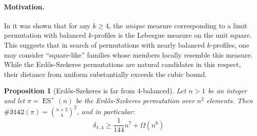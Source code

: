 \documentclass{article}
\newtheorem{proposition}[theorem]{Proposition}
\newcommand{\pc}[2]{{\# \mathtt{ #1 } \left( #2 \right)}}
\DeclareMathOperator{\ES}{ES}
\newcommand{\ESZ}{Erd\H{o}s-Szekeres\xspace}
\theoremstyle{remark}
\theoremstyle{plain}
\begin{document}
\paragraph{Motivation.} In \cite{kral2013quasirandom} it was shown that for any $k\ge 4$, the \emph{unique} measure corresponding to a limit permutation with balanced $k$-profiles is the Lebesgue measure on the unit square. This suggests that in search of permutations with nearly balanced $k$-profiles, one may consider ``square-like'' families whose members locally resemble this measure. While the \ESZ permutations are natural candidates in this respect, their distance from uniform substantially exceeds the cubic bound.

\begin{proposition} [\ESZ is far from $4$-balanced]
    \label{prop:distance_es_basic}
    Let $n > 1$ be an integer and let $\pi = \ES^+(n)$ be the \ESZ permutation over $n^2$ elements. Then $\pc{3142}{\pi} = \binom{n+2}{4}^2$, and in particular:
    \[
         \delta_{\pi, 4} \ge \frac{1}{144} n^{7} + \Omega(n^6)  
    \]
\end{proposition}
\end{document}
